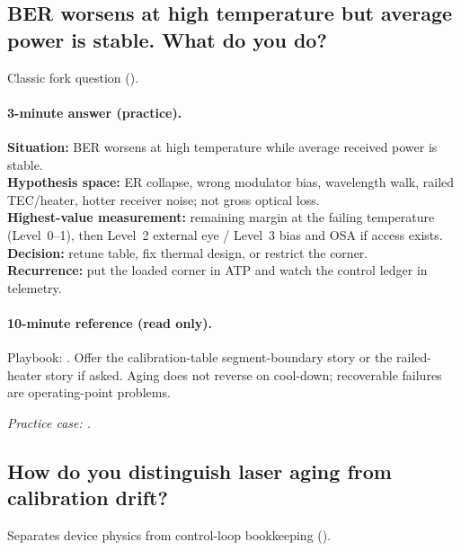 \subsection{BER worsens at high temperature but average power is stable. What do
you do?}
\label{sec:interview-worked-hot-ber}

Classic fork question ().


\paragraph{3-minute answer (practice).}
\textbf{Situation:} BER worsens at high temperature while average received
power is stable.\\
\textbf{Hypothesis space:} ER collapse, wrong modulator bias, wavelength walk,
railed TEC/heater, hotter receiver noise; not gross optical loss.\\
\textbf{Highest-value measurement:} remaining margin at the failing temperature
(Level~0--1), then Level~2 external eye / Level~3 bias and OSA if access
exists.\\
\textbf{Decision:} retune table, fix thermal design, or restrict the corner.\\
\textbf{Recurrence:} put the loaded corner in ATP and watch the control ledger
in telemetry.

\paragraph{10-minute reference (read only).}
Playbook: . Offer the calibration-table segment-boundary
story or the railed-heater story if asked. Aging does not reverse on cool-down;
recoverable failures are operating-point problems.


\noindent\textit{Practice case: .}
\subsection{How do you distinguish laser aging from calibration drift?}
\label{sec:interview-worked-aging-vs-cal}

Separates device physics from control-loop bookkeeping
().


